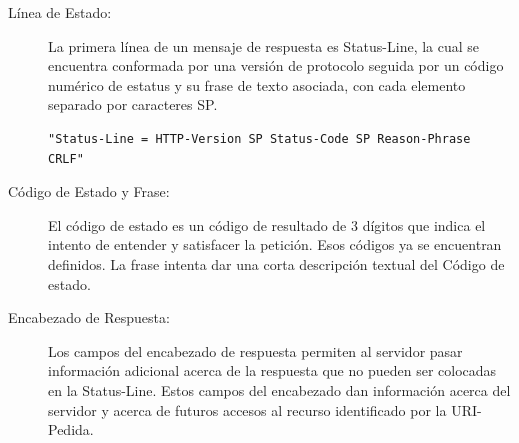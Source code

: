 \begin{description}

\item[Línea de Estado: ]
La primera línea de un mensaje de respuesta es Status-Line, la cual se encuentra conformada por una versión de protocolo seguida por un código numérico de estatus y su frase de texto asociada, con cada elemento separado por caracteres SP.

\begin{verbatim}
"Status-Line = HTTP-Version SP Status-Code SP Reason-Phrase CRLF"
\end{verbatim}

\item[Código de Estado y Frase: ]
El código de estado es un código de resultado de 3 dígitos que indica el intento de entender y satisfacer la petición. Esos códigos ya se encuentran definidos. La frase intenta dar una corta descripción textual del Código de estado. 

\item[Encabezado de Respuesta: ]
Los campos del encabezado de respuesta permiten al servidor pasar información adicional acerca de la respuesta que no pueden ser colocadas en la Status-Line. Estos campos del encabezado dan información acerca del servidor y acerca de futuros accesos al recurso identificado por la URI-Pedida.
\end{description}